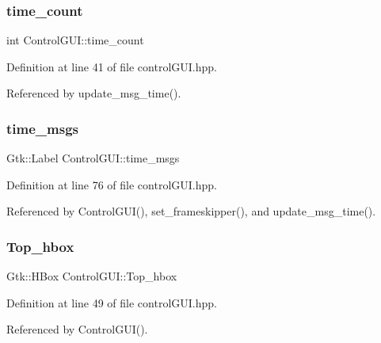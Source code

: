 \mbox{\label{class_control_g_u_i_a7cb0b94f14867e85d0f630fddf31d158}} 
\subsubsection{\texorpdfstring{time\+\_\+count}{time\_count}}
{\footnotesize\ttfamily int Control\+G\+U\+I\+::time\+\_\+count}



Definition at line 41 of file control\+G\+U\+I.\+hpp.



Referenced by update\+\_\+msg\+\_\+time().

\mbox{\label{class_control_g_u_i_a2816137ab08d4362af2418e73e1dcfb3}} 
\subsubsection{\texorpdfstring{time\+\_\+msgs}{time\_msgs}}
{\footnotesize\ttfamily Gtk\+::\+Label Control\+G\+U\+I\+::time\+\_\+msgs}



Definition at line 76 of file control\+G\+U\+I.\+hpp.



Referenced by Control\+G\+U\+I(), set\+\_\+frameskipper(), and update\+\_\+msg\+\_\+time().

\mbox{\label{class_control_g_u_i_a2b17142ef5bdc8b60d9e7b2fb74c47eb}} 
\subsubsection{\texorpdfstring{Top\+\_\+hbox}{Top\_hbox}}
{\footnotesize\ttfamily Gtk\+::\+H\+Box Control\+G\+U\+I\+::\+Top\+\_\+hbox}



Definition at line 49 of file control\+G\+U\+I.\+hpp.



Referenced by Control\+G\+U\+I().

